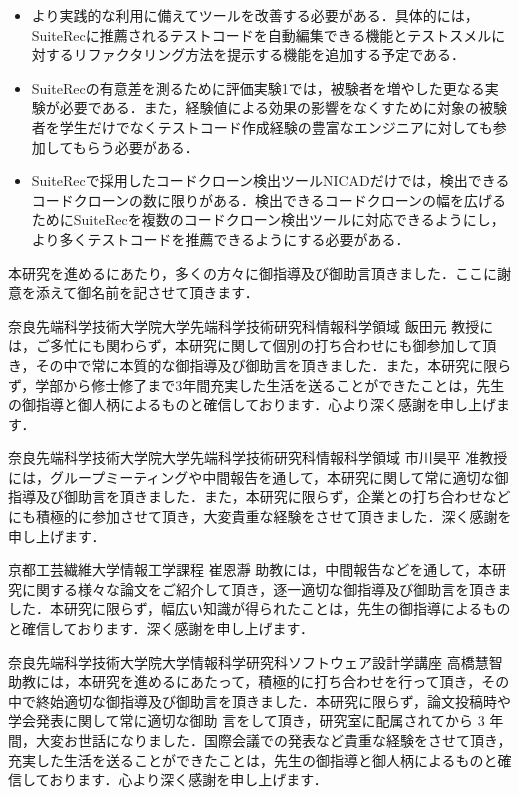 \documentclass[12pt]{jarticle} %
\begin{document}
\begin{itemize}
\item より実践的な利用に備えてツールを改善する必要がある．具体的には，{\sf SuiteRec}に推薦されるテストコードを自動編集できる機能とテストスメルに対するリファクタリング方法を提示する機能を追加する予定である．
\item {\sf SuiteRec}の有意差を測るために評価実験1では，被験者を増やした更なる実験が必要である．また，経験値による効果の影響をなくすために対象の被験者を学生だけでなくテストコード作成経験の豊富なエンジニアに対しても参加してもらう必要がある．
\item {\sf SuiteRec}で採用したコードクローン検出ツールNICADだけでは，検出できるコードクローンの数に限りがある．検出できるコードクローンの幅を広げるために{\sf SuiteRec}を複数のコードクローン検出ツールに対応できるようにし，より多くテストコードを推薦できるようにする必要がある．
\end{itemize}


%
%
\acknowledgements

本研究を進めるにあたり，多くの方々に御指導及び御助言頂きました．ここに謝意を添えて御名前を記させて頂きます．

奈良先端科学技術大学院大学先端科学技術研究科情報科学領域 飯田元 教授には，ご多忙にも関わらず，本研究に関して個別の打ち合わせにも御参加して頂き，その中で常に本質的な御指導及び御助言を頂きました．また，本研究に限らず，学部から修士修了まで3年間充実した生活を送ることができたことは，先生の御指導と御人柄によるものと確信しております．心より深く感謝を申し上げます．

奈良先端科学技術大学院大学先端科学技術研究科情報科学領域 市川昊平 准教授には，グループミーティングや中間報告を通して，本研究に関して常に適切な御指導及び御助言を頂きました．また，本研究に限らず，企業との打ち合わせなどにも積極的に参加させて頂き，大変貴重な経験をさせて頂きました．深く感謝を申し上げます．

京都工芸繊維大学情報工学課程 崔恩瀞 助教には，中間報告などを通して，本研究に関する様々な論文をご紹介して頂き，逐一適切な御指導及び御助言を頂きました．本研究に限らず，幅広い知識が得られたことは，先生の御指導によるものと確信しております．深く感謝を申し上げます．

奈良先端科学技術大学院大学情報科学研究科ソフトウェア設計学講座 高橋慧智 助教には，本研究を進めるにあたって，積極的に打ち合わせを行って頂き，その中で終始適切な御指導及び御助言を頂きました．本研究に限らず，論文投稿時や学会発表に関して常に適切な御助 言をして頂き，研究室に配属されてから 3 年間，大変お世話になりました．国際会議での発表など貴重な経験をさせて頂き，充実した生活を送ることができたことは，先生の御指導と御人柄によるものと確信しております．心より深く感謝を申し上げます．
\end{document}

